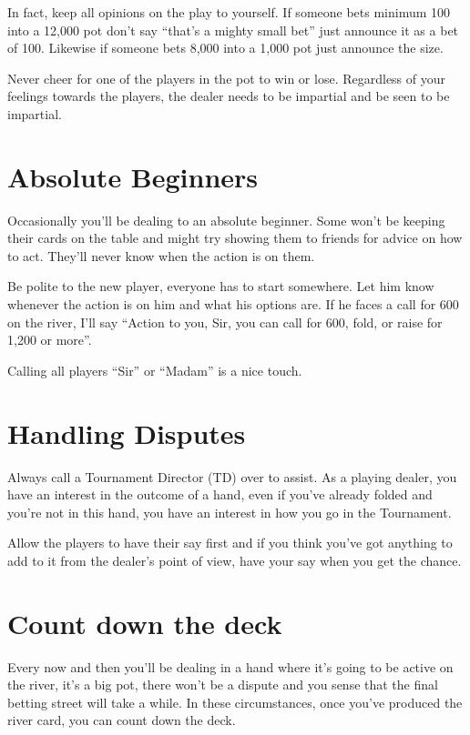 In fact, keep all opinions on the play to yourself. If someone
bets minimum 100 into a 12,000 pot don't say ``that's a mighty small bet''
just announce it as a bet of 100. Likewise if someone bets 8,000 into
a 1,000 pot just announce the size.

Never cheer for one of the players in the pot to win or lose.
Regardless of your feelings towards the players, the dealer needs to
be impartial and be seen to be impartial.

\section{Absolute Beginners}

Occasionally you'll be dealing to an absolute beginner. Some won't be
keeping their cards on the table and might try showing them to friends
for advice on how to act. They'll never know when the action is on them.

Be polite to the new player, everyone has to start somewhere. Let him
know whenever the action is on him and what his options are. If he
faces a call for 600 on the river, I'll say ``Action to you, Sir, you
can call for 600, fold, or raise for 1,200 or more''.

Calling all players ``Sir'' or ``Madam'' is a nice touch.

\section{Handling Disputes}

Always call a Tournament Director (TD) over to assist. As a playing
dealer, you have an interest in the outcome of a hand, even
if you've already folded and you're not in this hand, you have
an interest in how you go in the Tournament.

Allow the players to have their say first and if you think you've
got anything to add to it from the dealer's point of view, have
your say when you get the chance.

\section{Count down the deck}

Every now and then you'll be dealing in a hand where it's going to be
active on the river, it's a big pot, there won't be a dispute and you
sense that the final betting street will take a while. In these
circumstances, once you've produced the river card, you can count
down the deck.

